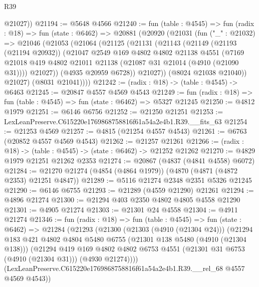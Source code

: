 \begin{lexlean}{R39}
\begin{coremodule}
        @21027))
@21194 := @5648 @4566
@21240 := fun (table : @4545) =>
  fun (radix : @18) =>
  fun (state : @6462) =>
  @20881
    (@20920
      (@21031
        (fun ("_" : @21032) =>
        @21046
          (@21053
            (@21064
              (@21125
                (@21131
                  (@21143
                    (@21149
                      (@21193 (@21194 @20932))
                      (@21047
                        @2549
                        @169
                        @4802
                        @4802
                        @21138
                        @4551
                        (@7169
                          @21018
                          @419
                          @4802
                          @21011
                          @21138
                          (@21087 @31 @21014 (@4910 (@21090 @31))))
                        @21027))
                    (@4935 @20959 @6728))
                  @21027))
              (@8024 @21038 @21040))
            @21027)
          (@8031 @21041))))
@21242 := (radix : @18) -> (table : @4545) -> @6463
@21245 := @20847 @4557 @4569 @4543
@21249 := fun (radix : @18) => fun (table : @4545) => fun (state : @6462) => @5327 @21245
@21250 := @4812 @1979
@21251 := @6146 @6756
@21252 := @21250 @21251
@21253 := LexLeanPreserve.C615220e1769868758816f61a54a2e4b1.R39.__fits_63
@21254 := @21253 @4569
@21257 := @4815 (@21254 @4557 @4543)
@21261 := @6763 (@20852 @4557 @4569 @4543)
@21262 := @21257 @21261
@21266 := (radix : @18) -> (table : @4545) -> (state : @6462) -> @21252 @21262
@21270 := @4829 @1979 @21251 @21262 @2353
@21274 := @20867 (@4837 (@4841 @4558) @6072)
@21284 := @21270 @21274 (@4854 (@4864 @1979)) (@4870 (@4871 (@4872 @2353) @21251 @4847))
@21289 := @5116 @21274 @2348 @2351 @5326 @21245
@21290 := @6146 @6755
@21293 := @21289 (@4559 @21290) @21261
@21294 := @4896 @21274
@21300 := @21294 @403 @2350 @4802 @4805 @4558 @21290
@21301 := @4905 @21274
@21303 := @21301 @24 @4558
@21304 := @4911 @21274
@21346 := fun (radix : @18) =>
  fun (table : @4545) =>
  fun (state : @6462) =>
  @21284
    (@21293
      (@21300
        (@21303 (@4910 (@21304 @24)))
        (@21294
          @183
          @421
          @4802
          @4804
          @5480
          @6755
          (@21301 @138 @5480 (@4910 (@21304 @138)))
          (@21294
            @419
            @169
            @4802
            @4802
            @6753
            @4551
            (@21301 @31 @6753 (@4910 (@21304 @31)))
            (@4930 @21274))))
      (LexLeanPreserve.C615220e1769868758816f61a54a2e4b1.R39.__rel_68 @4557 @4569 @4543))

\end{coremodule}
\end{lexlean}
